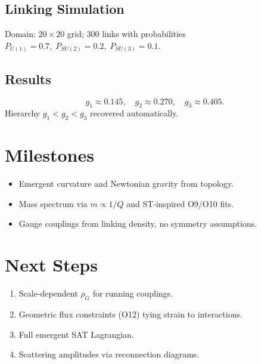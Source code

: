 \documentclass[11pt]{article}
\begin{document}
\subsection{Linking Simulation}
Domain: \(20\times20\) grid; 300 links with probabilities
\(P_{U(1)}=0.7,\;P_{SU(2)}=0.2,\;P_{SU(3)}=0.1\).

\subsection{Results}
\[
g_1\approx0.145,\quad
g_2\approx0.270,\quad
g_3\approx0.405.
\]
Hierarchy \(g_1<g_2<g_3\) recovered automatically.

\section{Milestones}
\begin{itemize}
\item Emergent curvature and Newtonian gravity from topology.
\item Mass spectrum via \(m\propto1/Q\) and ST‑inspired O9/O10 fits.
\item Gauge couplings from linking density, no symmetry assumptions.
\end{itemize}

\section{Next Steps}
\begin{enumerate}
\item Scale‑dependent \(\rho_G\) for running couplings.
\item Geometric flux constraints (O12) tying strain to interactions.
\item Full emergent SAT Lagrangian.
\item Scattering amplitudes via reconnection diagrams.
\end{enumerate}
\end{document}
